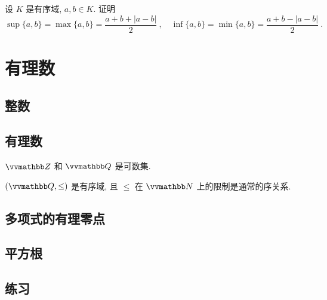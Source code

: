 \begin{exercise}\label{ex:max-and-min-on-ordered-ﬁeld}
    设 \(K\) 是有序域, \(a, b \in K\). 证明
    \[
        \sup\{a, b\} = \max\{a, b\} = \dfrac{a + b + |a - b|}{2}\ ,\quad \inf\{a, b\} = \min\{a, b\} = \dfrac{a + b - |a - b|}{2}\ .
    \]
\end{exercise}

\newpage

\section{有理数}

\subsection{整数}

\subsection{有理数}

\begin{proposition}\label{prop:Q-is-countable}
    \(\Z\) 和 \(\Q\) 是可数集.
\end{proposition}

\begin{theorem}\label{thm:Q-is-ordered-filed}
    \((\Q, \leq)\) 是有序域, 且 \(\leq\) 在 \(\N\) 上的限制是通常的序关系.
\end{theorem}

\subsection{多项式的有理零点}

\subsection{平方根}

\subsection{练习}

